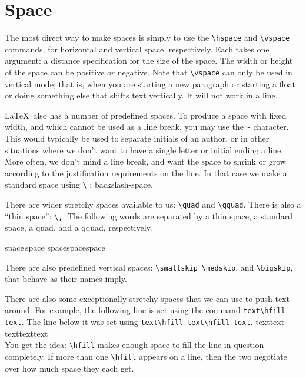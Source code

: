 \documentclass[a4paper,12pt]{extarticle}
\begin{document}
\section{Space}
The most direct way to make spaces is simply to use the \verb|\hspace| and
\verb|\vspace| commands, for horizontal and vertical space, respectively. Each
takes one argument: a distance specification for the size of the space. The
width or height of the space can be positive $or$ negative. Note that \verb|\vspace|
can only be used in vertical mode; that is, when you are starting a new paragraph or starting a float or doing something else that shifts text vertically.
It will not work in a line.
\par
\LaTeX\ also has a number of predefined spaces. To produce a space with
fixed width, and which cannot be used as a line break, you may use the \verb|~|
character. This would typically be used to separate initials of an author,
or in other situations where we don’t want to have a single letter or initial
ending a line. More often, we don’t mind a line break, and want the space
to shrink or grow according to the justification requirements on the line. In
that case we make a standard space using \verb|\| ; backslash-space.
\par
There are wider stretchy spaces available to us: \verb|\quad| and \verb|\qquad|. There
is also a ``thin space'': \verb|\,|. The following words are separated by a thin space,
a standard space, a quad, and a qquad, respectively.
\begin{center}
space\,space space\quad space\qquad space
\end{center}
\par
There are also predefined vertical spaces: \verb|\smallskip \medskip|, and
\verb|\bigskip|, that behave as their names imply.
\par
There are also some exceptionally stretchy spaces that we can use to
push text around. For example, the following line is set using the command
\verb|text\hfill text|. The line below it was set using \verb|text\hfill text\hfill text|.
text\hfill text\\
text\hfill text\hfill text\\
You get the idea: \verb|\hfill| makes enough space to fill the line in question completely. If more than one \verb|\hfill| appears on a line, then the two negotiate
over how much space they each get.
\end{document}

